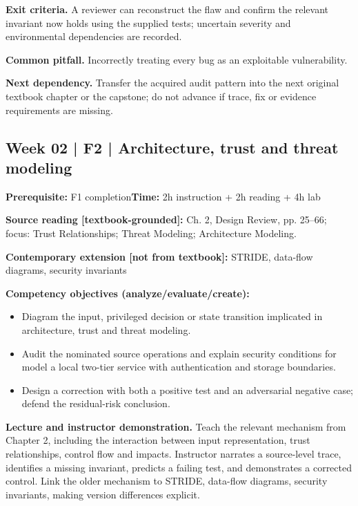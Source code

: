 \documentclass[10pt,letterpaper]{article}
\begin{document}
\textbf{Exit criteria.} A reviewer can reconstruct the flaw and confirm the relevant invariant now holds using the supplied tests; uncertain severity and environmental dependencies are recorded.

\textbf{Common pitfall.} Incorrectly treating every bug as an exploitable vulnerability.

\textbf{Next dependency.} Transfer the acquired audit pattern into the next original textbook chapter or the capstone; do not advance if trace, fix or evidence requirements are missing.

\subsection{Week 02 | F2 | Architecture, trust and threat modeling}
\textbf{Prerequisite:} F1 completion\hfill\textbf{Time:} 2h instruction + 2h reading + 4h lab

\textbf{Source reading [textbook-grounded]:} Ch. 2, Design Review, pp. 25--66; focus: Trust Relationships; Threat Modeling; Architecture Modeling.

\textbf{Contemporary extension [not from textbook]:} STRIDE, data-flow diagrams, security invariants

\textbf{Competency objectives (analyze/evaluate/create):}
\begin{itemize}[leftmargin=*,itemsep=2pt]
\item Diagram the input, privileged decision or state transition implicated in architecture, trust and threat modeling.
\item Audit the nominated source operations and explain security conditions for model a local two-tier service with authentication and storage boundaries.
\item Design a correction with both a positive test and an adversarial negative case; defend the residual-risk conclusion.
\end{itemize}
\textbf{Lecture and instructor demonstration.} Teach the relevant mechanism from Chapter 2, including the interaction between input representation, trust relationships, control flow and impacts. Instructor narrates a source-level trace, identifies a missing invariant, predicts a failing test, and demonstrates a corrected control. Link the older mechanism to STRIDE, data-flow diagrams, security invariants, making version differences explicit.
\end{document}
